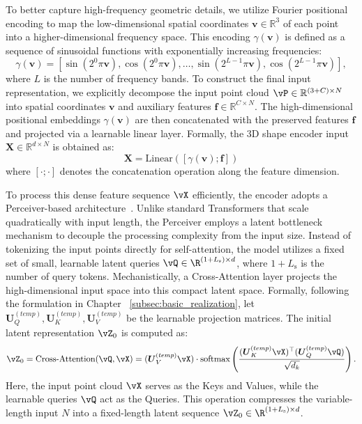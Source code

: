 \documentclass[../../book-main.tex]{subfiles}
\begin{document}
To better capture high-frequency geometric details,
we utilize Fourier positional encoding to map the
low-dimensional spatial coordinates
$\boldsymbol{v} \in \mathbb{R}^3$
of each point into a higher-dimensional frequency space.
This encoding $\gamma(\boldsymbol{v})$ is defined as a
sequence of sinusoidal functions with exponentially
increasing frequencies:$$\gamma(\boldsymbol{v}) = [\sin(2^0\pi
\boldsymbol{v}), \cos(2^0\pi \boldsymbol{v}), \dots, \sin(2^{L-1}\pi
\boldsymbol{v}), \cos(2^{L-1}\pi \boldsymbol{v})],$$
where $L$ is the number of frequency bands.
To construct the final input representation, we explicitly
decompose the input point cloud $\vP \in \mathbb{R}^{(3+C)
\times N}$ into spatial coordinates $\boldsymbol{v}$ and
auxiliary features $\boldsymbol{f} \in \mathbb{R}^{C \times
N}$. The high-dimensional positional embeddings
$\gamma(\boldsymbol{v})$ are then concatenated with the
preserved features $\boldsymbol{f}$ and projected via a
learnable linear layer. Formally, the 3D shape encoder input
$\boldsymbol{X} \in \mathbb{R}^{d \times N}$ is obtained
as:$$\boldsymbol{X} = \text{Linear}([\gamma(\boldsymbol{v});
\boldsymbol{f}])$$where $[\cdot ; \cdot]$ denotes the
concatenation operation along the feature dimension.


To process this dense feature sequence $\vX$ efficiently,
the encoder adopts a
Perceiver-based architecture~\cite{pmlr-v139-jaegle21a}. Unlike
standard Transformers that scale quadratically with input length,
the Perceiver employs a latent bottleneck mechanism to decouple
the processing complexity from the input size. Instead of tokenizing the
input points directly for self-attention, the model utilizes a fixed set
of small, learnable latent queries $\vQ \in \R^{(1+L_{\mathrm{s}}) \times
d}$, where $1 + L_{\mathrm{s}}$ is the number of query tokens.
Mechanistically, a Cross-Attention layer projects the high-dimensional
input space into this compact latent space. Formally, following the
formulation in Chapter ~\ref{subsec:basic_realization}, let
$\boldsymbol{U}^{(temp)}_{Q}, \boldsymbol{U}^{(temp)}_{K},
\boldsymbol{U}^{(temp)}_{V}$ be the learnable projection matrices.
The initial latent
representation $\vZ_0$ is computed as:
$$\vZ_0 = \text{Cross-Attention}
(\vQ, \vX) = (\boldsymbol{U}^{(temp)}_{V}\vX) \cdot
\text{softmax}\left(\frac{(\boldsymbol{U}^{(temp)}_{K}\vX)^\top(\boldsymbol{U}^{(temp)}_{Q}\vQ)}
{\sqrt{d_k}}\right).$$
Here, the input point cloud $\vX$ serves
as the Keys and Values, while the learnable queries $\vQ$ act as the
Queries. This operation compresses the variable-length input $N$ into a
fixed-length latent sequence $\vZ_0 \in \R^{(1+L_{\mathrm{s}}) \times
d}$.
\end{document}
